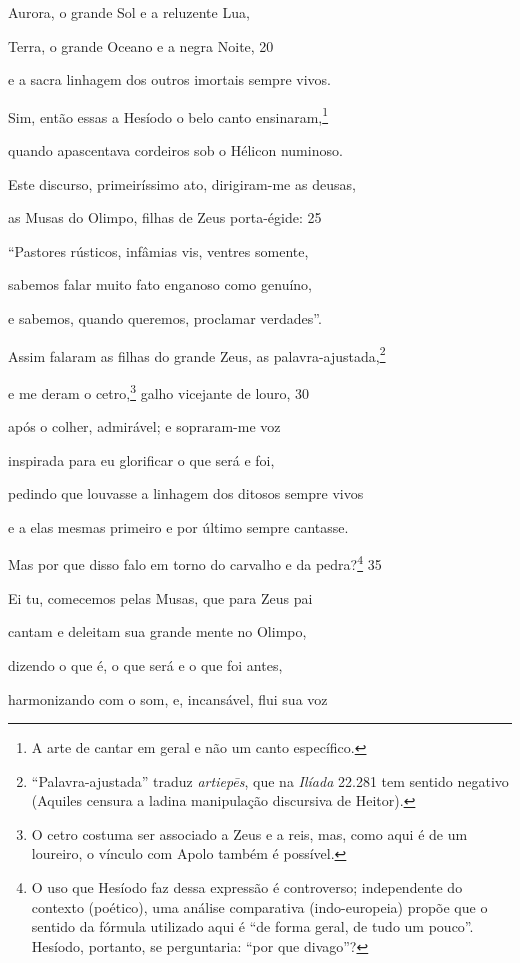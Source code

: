 Aurora, o grande Sol e a reluzente Lua,

Terra, o grande Oceano e a negra Noite, \num{20}

e a sacra linhagem dos outros imortais sempre vivos.

\quad{}Sim, então essas a Hesíodo o belo canto ensinaram,\footnote{A arte de cantar em geral e não um canto específico.}

quando apascentava cordeiros sob o Hélicon numinoso.

Este discurso, primeiríssimo ato, dirigiram-me as deusas,

as Musas do Olimpo, filhas de Zeus porta-égide: \num{25}

``Pastores rústicos, infâmias vis, ventres somente,

sabemos falar muito fato enganoso como genuíno,

e sabemos, quando queremos, proclamar verdades''.

Assim falaram as filhas do grande Zeus, as palavra-ajustada,\footnote{``Palavra-ajustada'' traduz \emph{artiepēs}, que na \emph{Ilíada}
22.281 tem sentido negativo (Aquiles censura a ladina manipulação
discursiva de Heitor).}

e me deram o cetro,\footnote{O cetro costuma ser associado a Zeus e a reis, mas, como aqui é de
um loureiro, o vínculo com Apolo também é possível.} galho vicejante de louro, \num{30}

após o colher, admirável; e sopraram-me voz

inspirada para eu glorificar o que será e foi,

pedindo que louvasse a linhagem dos ditosos sempre vivos

e a elas mesmas primeiro e por último sempre cantasse.

\quad{}Mas por que disso falo em torno do carvalho e da pedra?\footnote{O uso que Hesíodo faz dessa expressão é controverso; independente do
contexto (poético), uma análise comparativa (indo-europeia) propõe que o
sentido da fórmula utilizado aqui é ``de forma geral, de tudo um
pouco''. Hesíodo, portanto, se perguntaria: ``por que divago''?} \num{35}

Ei tu, comecemos pelas Musas, que para Zeus pai

cantam e deleitam sua grande mente no Olimpo,

dizendo o que é, o que será e o que foi antes,

harmonizando com o som, e, incansável, flui sua voz

